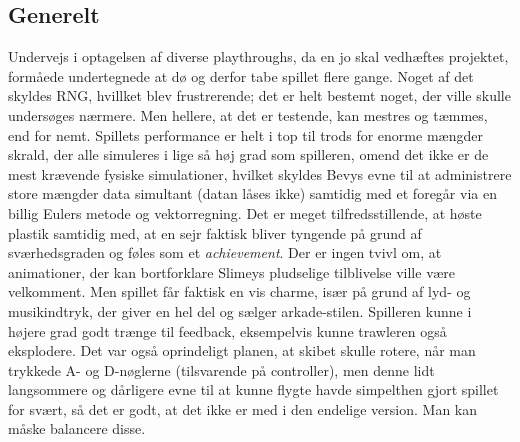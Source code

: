 \subsection{Generelt}
Undervejs i optagelsen af diverse playthroughs, da en jo skal vedhæftes projektet, formåede undertegnede at dø og derfor tabe spillet flere gange. Noget af det skyldes RNG, hvillket blev frustrerende; det er helt bestemt noget, der ville skulle undersøges nærmere. Men hellere, at det er testende, kan mestres og tæmmes, end for nemt. Spillets performance er helt i top til trods for enorme mængder skrald, der alle simuleres i lige så høj grad som spilleren, omend det ikke er de mest krævende fysiske simulationer, hvilket skyldes Bevys evne til at administrere store mængder data simultant (datan låses ikke) samtidig med et foregår via en billig Eulers metode og vektorregning. Det er meget tilfredsstillende, at høste plastik samtidig med, at en sejr faktisk bliver tyngende på grund af sværhedsgraden og føles som et \textit{achievement}. Der er ingen tvivl om, at animationer, der kan bortforklare Slimeys pludselige tilblivelse ville være velkomment. Men spillet får faktisk en vis charme, især på grund af lyd- og musikindtryk, der giver en hel del og sælger arkade-stilen. Spilleren kunne i højere grad godt trænge til feedback, eksempelvis kunne trawleren også eksplodere. Det var også oprindeligt planen, at skibet skulle rotere, når man trykkede A- og D-nøglerne (tilsvarende på controller), men denne lidt langsommere og dårligere evne til at kunne flygte havde simpelthen gjort spillet for svært, så det er godt, at det ikke er med i den endelige version. Man kan måske balancere disse.
